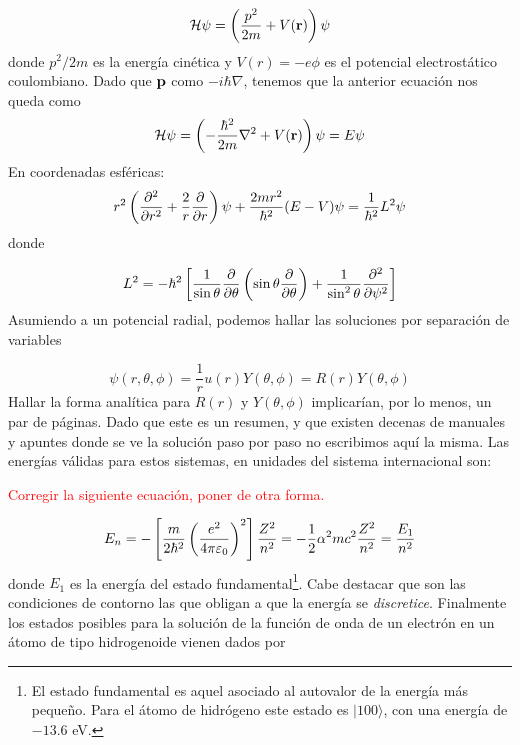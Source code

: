 \begin{equation}
    \mathcal{H} \psi =\left( \frac{p^2}{2m} + V(\mathbf{r}) \right) \psi 
\end{equation}
donde $p^2/2m$ es la energía cinética y $V(r)=-e\phi$ es el potencial electrostático coulombiano. Dado que $\mathbf{p} $ como $-i\hbar \nabla$, tenemos que la anterior ecuación nos queda como
\begin{equation}
    \mathcal{H} \psi = \left( - \frac{\hbar^2}{2m} \nabla^2 + V(\mathbf{r}) \right) \psi = E \psi
\end{equation}
En coordenadas esféricas:
\begin{equation}
    r^2 \left( \frac{\partial ^2}{\partial r^2} + \frac{2}{r} \frac{\partial }{\partial r} \right) \psi + \frac{2mr^2}{\hbar^2} (E-V) \psi = \frac{1}{\hbar^2} L^2 \psi
\end{equation}
donde 

\begin{equation}
    L^2 = - \hbar^2 \left[ \frac{1}{\sin \theta} \frac{\partial }{\partial \theta} \left( \sin  \theta \frac{\partial }{\partial \theta} \right) + \frac{1}{\sin^2 \theta} \frac{\partial ^2}{\partial \psi^2} \right]
\end{equation}
Asumiendo a un potencial radial, podemos hallar las soluciones por separación de variables

\begin{equation}
    \psi (r,\theta,\phi) =  \frac{1}{r} u(r) Y(\theta,\phi) = R(r) Y(\theta, \phi)
\end{equation}
Hallar la forma analítica para $R(r)$ y $Y(\theta,\phi)$ implicarían, por lo menos, un par de páginas. Dado que este es un resumen, y que existen decenas de manuales y apuntes donde se ve la solución paso por paso no escribimos aquí la misma. Las energías válidas para estos sistemas, en unidades del sistema internacional son: 
\begin{Anotacion}
	\textcolor{red}{Corregir la siguiente ecuación, poner de otra forma.}
\end{Anotacion}
\begin{equation}
    E_n = - \left[ \frac{m}{2\hbar^2} \left( \frac{e^2}{4 \pi \varepsilon_0} \right)^2 \right] \frac{Z^2}{n^2} = - \frac{1}{2} \alpha^2 m c^2 \frac{Z^2}{n^2 } = \frac{E_1}{n^2}
\end{equation}
donde $E_1$ es la energía del estado fundamental\footnote{El estado fundamental es aquel asociado al autovalor de la energía más pequeño. Para el átomo de hidrógeno este estado es $|100\rangle$, con una energía de $-13.6$ eV.}. Cabe destacar que son las condiciones de contorno las que obligan a que la energía se \textit{discretice}. Finalmente los estados posibles para la solución de la función de onda de un electrón en un átomo de tipo hidrogenoide vienen dados por

